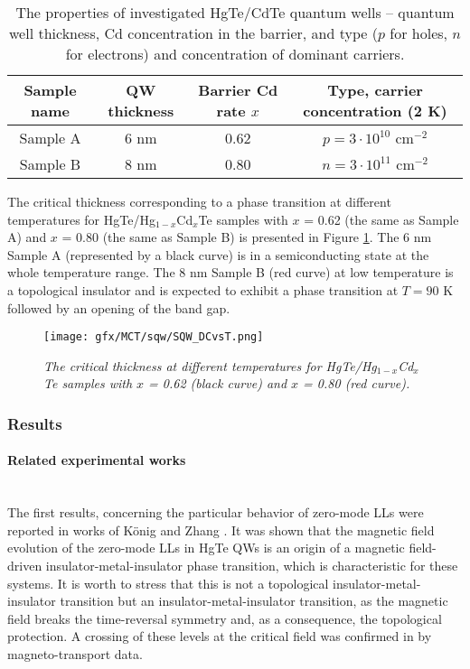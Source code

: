 \documentclass[titlepage,a4paper]{book}
\newcommand{\wciecie}{\quad\phantom{v}}
\newcommand{\myparagraph}[1]{\paragraph{#1}\mbox{}\\}
\begin{document}
\begin{table}[h]
\label{tab:MCT_QW_properties}
\caption{The properties of investigated HgTe/CdTe quantum wells -- quantum well thickness, Cd concentration in the barrier, and type ($p$ for holes, $n$ for electrons) and concentration of dominant carriers.}
\vspace{10pt}
\centering
\begin{tabular}{ c | c | c | c}	
\textbf{Sample name} & \textbf{QW thickness} & \textbf{Barrier Cd rate $x$} & \textbf{Type, carrier concentration (2 K)}\\
\hline\hline
Sample A & 6 nm & 0.62 & $p = 3\cdot10^{10}$ cm$^{-2}$\\ \hline
Sample B & 8 nm & 0.80 & $n = 3\cdot10^{11}$ cm$^{-2}$\\ \hline\hline 
\end{tabular}
\end{table}

The critical thickness corresponding to a phase transition at different temperatures for HgTe/Hg$_{1-x}$Cd$_{x}$Te samples with $x$ = 0.62 (the same as Sample A) and $x$ = 0.80 (the same as Sample B) is presented in Figure \ref{fig:SQW_DCvsT}. The 6 nm Sample A (represented by a black curve) is in a semiconducting state at the whole temperature range. The 8 nm Sample B (red curve) at low temperature is a topological insulator and is expected to exhibit a phase transition at $T = 90$ K followed by an opening of the band gap.

\begin{figure}[H]
	\centering
	\texttt{[image: gfx/MCT/sqw/SQW\_DCvsT.png]}
	\vspace{-10pt}
	\caption{\textit{The critical thickness at different temperatures for HgTe/Hg$_{1-x}$Cd$_{x}$Te samples with $x$ = 0.62 (black curve) and $x$ = 0.80 (red curve).}}
	\label{fig:SQW_DCvsT}
\end{figure} 

\subsubsection{Results}
\label{sec:MCT_QW}
\myparagraph{Related experimental works}
\wciecie
The first results, concerning the particular behavior of zero-mode LLs were reported in works of König \cite{Konig_Topology} and Zhang \cite{Zhang_Topology}. It was shown that the magnetic field evolution of the zero-mode LLs in HgTe QWs is an origin of a magnetic field-driven insulator-metal-insulator phase transition, which is characteristic for these systems. It is worth to stress that this is not a topological insulator-metal-insulator transition but an insulator-metal-insulator transition, as the magnetic field breaks the time-reversal symmetry and, as a consequence, the topological protection. A crossing of these levels at the critical field was confirmed in \cite{Konig_Topology} by magneto-transport data.
\end{document}
